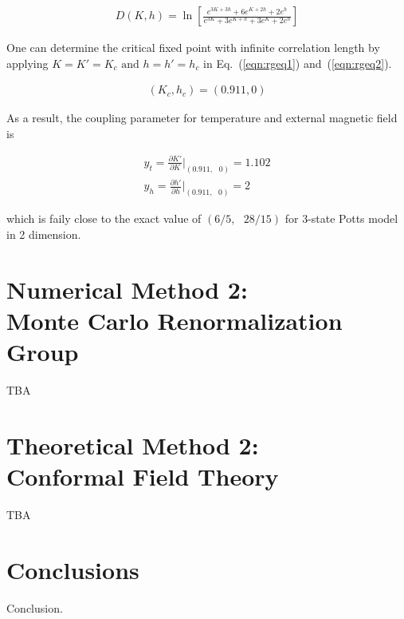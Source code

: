 \documentclass[%
 reprint,
 amsmath,amssymb,
 aps,
]{revtex4-2}
\begin{document}

\begin{align}
D(K,h) = \ln\left[\frac{e^{3K+3h}+6e^{K+2h}+2e^{h}}{e^{3K}+3e^{K+h}+3e^{K}+2e^{h}}\right]
\end{align}

One can determine the critical fixed point with infinite correlation length by applying
$K=K'=K_c \text{ and }h=h'=h_c$ in Eq.~(\ref{eqn:rgeq1}) and~(\ref{eqn:rgeq2}).

\begin{eqnarray}
\left(K_c,h_c\right) = (0.911, 0) \label{eqn:cfp}
\end{eqnarray}

As a result, the coupling parameter for temperature and external magnetic field is

\begin{gather}
y_{t} = \frac{\partial K'}{\partial K} \bigg|_{(0.911,\text{ }0)} = 1.102 \\
y_{h} = \frac{\partial h'}{\partial h} \bigg|_{(0.911,\text{ }0)} = 2
\end{gather}

which is faily close to the exact value of $(6/5, \text{ } 28/15)$ for 3-state Potts model 
in 2 dimension.

\section{\label{sec:mcrg}Numerical Method 2: \\ Monte Carlo Renormalization Group}
TBA

\section{\label{sec:cft}Theoretical Method 2: \\ Conformal Field Theory}
TBA

\section{Conclusions}
Conclusion.

\end{document}
